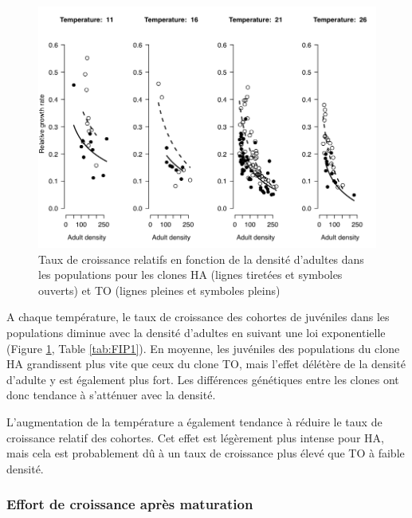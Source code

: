 \begin{figure}[!ht]
\begin{center}
\includegraphics[width=\textwidth]{1_CorpsDeThese/Resumes/Fig/FIP04}
\caption[Taux de croissance
relatifs]{Taux de croissance relatifs en fonction de la densité d'adultes dans
les populations pour les clones HA (lignes tiretées et symboles ouverts) et TO
(lignes pleines et symboles pleins)}
\label{fig:FIP4}
\end{center}
\end{figure}

A chaque température, le taux de croissance des cohortes de juvéniles dans les
populations diminue avec la densité d'adultes en suivant une loi exponentielle
(Figure \ref{fig:FIP4}, Table \ref{tab:FIP1}). En moyenne, les juvéniles des
populations du clone HA grandissent plus vite que ceux du clone TO, mais l'effet
délétère de la densité d'adulte y est également plus fort. Les différences
génétiques entre les clones ont donc tendance à s'atténuer avec la densité. 

L'augmentation de la température a également tendance à réduire le taux de
croissance relatif des cohortes. Cet effet est légèrement plus intense pour HA,
mais cela est probablement dû à un taux de croissance plus élevé que TO à
faible densité. 

\subsubsection{Effort de croissance après maturation}

